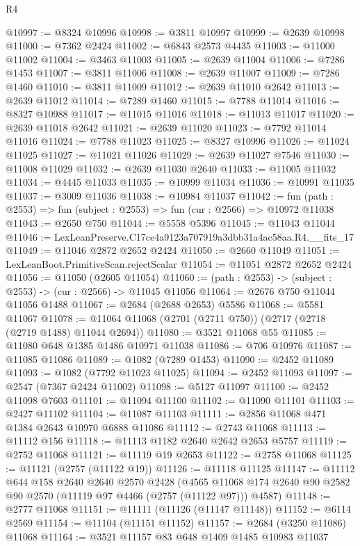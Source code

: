 \begin{lexlean}{R4}
\begin{coremodule}
@10997 := @8324 @10996
@10998 := @3811 @10997
@10999 := @2639 @10998
@11000 := @7362 @2424
@11002 := @6843 @2573 @4435
@11003 := @11000 @11002
@11004 := @3463 @11003
@11005 := @2639 @11004
@11006 := @7286 @1453
@11007 := @3811 @11006
@11008 := @2639 @11007
@11009 := @7286 @1460
@11010 := @3811 @11009
@11012 := @2639 @11010 @2642
@11013 := @2639 @11012
@11014 := @7289 @1460
@11015 := @7788 @11014
@11016 := @8327 @10988
@11017 := @11015 @11016
@11018 := @11013 @11017
@11020 := @2639 @11018 @2642
@11021 := @2639 @11020
@11023 := @7792 @11014 @11016
@11024 := @7788 @11023
@11025 := @8327 @10996
@11026 := @11024 @11025
@11027 := @11021 @11026
@11029 := @2639 @11027 @7546
@11030 := @11008 @11029
@11032 := @2639 @11030 @2640
@11033 := @11005 @11032
@11034 := @4445 @11033
@11035 := @10999 @11034
@11036 := @10991 @11035
@11037 := @3009 @11036
@11038 := @10984 @11037
@11042 := fun (path : @2553) => fun (subject : @2553) => fun (cur : @2566) => @10972 @11038
@11043 := @2650 @750
@11044 := @5558 @5396
@11045 := @11043 @11044
@11046 := LexLeanPreserve.C17ce4a9123a707919a3dbb31a4ac58aa.R4.__fits_17
@11049 := @11046 @2872 @2652 @2424
@11050 := @2660 @11049
@11051 := LexLeanBoot.PrimitiveScan.rejectScalar
@11054 := @11051 @2872 @2652 @2424
@11056 := @11050 (@2605 @11054)
@11060 := (path : @2553) -> (subject : @2553) -> (cur : @2566) -> @11045 @11056
@11064 := @2676 @750 @11044 @11056 @1488
@11067 := @2684 (@2688 @2653) @5586
@11068 := @5581 @11067
@11078 := @11064 @11068 (@2701 (@2711 @750)) (@2717 (@2718 (@2719 @1488) @11044 @2694))
@11080 := @3521 @11068 @55
@11085 := @11080 @648 @1385 @1486 @10971 @11038
@11086 := @706 @10976
@11087 := @11085 @11086
@11089 := @1082 (@7289 @1453)
@11090 := @2452 @11089
@11093 := @1082 (@7792 @11023 @11025)
@11094 := @2452 @11093
@11097 := @2547 (@7367 @2424 @11002)
@11098 := @5127 @11097
@11100 := @2452 @11098 @7603
@11101 := @11094 @11100
@11102 := @11090 @11101
@11103 := @2427 @11102
@11104 := @11087 @11103
@11111 := @2856 @11068 @471 @1384 @2643 @10970 @6888 @11086
@11112 := @2743 @11068
@11113 := @11112 @156
@11118 := @11113 @1182 @2640 @2642 @2653 @5757
@11119 := @2752 @11068
@11121 := @11119 @19 @2653
@11122 := @2758 @11068
@11125 := @11121 (@2757 (@11122 @19))
@11126 := @11118 @11125
@11147 := @11112
    @644
    @158
    @2640
    @2640
    @2570
    @2428
    (@4565 @11068 @174 @2640 @90 @2582 @90 @2570 (@11119 @97 @4466 (@2757 (@11122 @97))) @4587)
@11148 := @2777 @11068
@11151 := @11111 (@11126 (@11147 @11148))
@11152 := @6114 @2569
@11154 := @11104 (@11151 @11152)
@11157 := @2684 (@3250 @11086) @11068
@11164 := @3521 @11157 @83 @648 @1409 @1485 @10983 @11037

\end{coremodule}
\end{lexlean}
